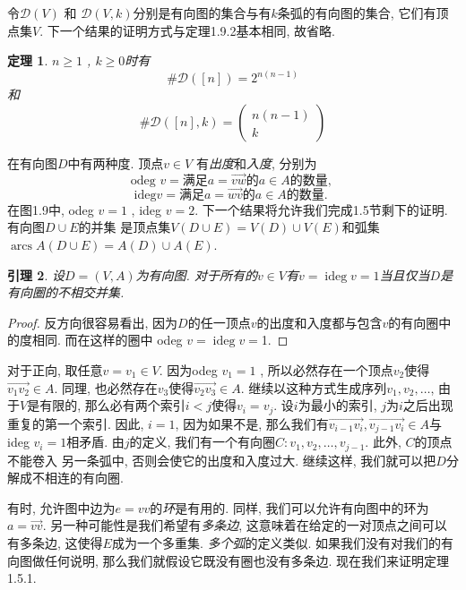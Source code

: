 \documentclass{ctexbook}
\newtheorem{thm}{定理}[section]
\newtheorem{lem}[thm]{引理}
\begin{document}
令$\mathcal{D}(V)$ 和 $\mathcal{D}(V, k)$分别是有向图的集合与有$k$条弧的有向图的集合, 它们有顶点集$V$.
下一个结果的证明方式与定理1.9.2基本相同, 故省略.
     \begin{thm}
    	$n \geqslant 1$ ,  $k \geqslant 0$时有
    	$$
    	\# \mathcal{D}([n])=2^{n(n-1)}
    	$$
    	和
    	$$
    	\# \mathcal{D}([n], k)=\left(\begin{array}{c}
    	n(n-1) \\
    	k
    	\end{array}\right)
    	$$
    \end{thm}

在有向图$D$中有两种度. 顶点$v \in V$ 有\textsl{出度}和\textsl{入度}, 分别为
$$
\text{odeg }v= \text{满足} a=\overrightarrow{v w} \text{的} a \in A \text{的数量, }
$$
$$
\text{ideg} v= \text{满足} a=\overrightarrow{w v} \text{的} a \in A \text{的数量. }
$$
在图1.9中, odeg $v=1$ ,  ideg $v=2$. 下一个结果将允许我们完成1.5节剩下的证明. 有向图$D \cup E$的并集
是顶点集$V(D \cup E)=V(D) \cup V(E)$和弧集$\operatorname{arcs} A(D \cup E)=A(D) \cup A(E)$.
    \begin{lem}
   设$D=(V, A)$为有向图. 对于所有的$v \in V$有$v=\operatorname{ideg} v=1$当且仅当$D$是有向圈的不相交并集.
   \end{lem}
   \begin{proof}
   	反方向很容易看出, 因为$D$的任一顶点$v$的出度和入度都与包含$v$的有向圈中的度相同. 而在这样的圈中 odeg $ v=\operatorname{ideg} v=$1.
   \end{proof}

对于正向, 取任意$v=v_{1} \in V$. 因为odeg $v_{1}=1$ , 所以必然存在一个顶点$v_{2}$使得$\overrightarrow{v_{1} v_{2}} \in A $.
同理, 也必然存在$v_{3}$使得$\overrightarrow{v_{2}v_{3}} \in A$. 继续以这种方式生成序列$v_{1}, v_{2}, \ldots$,
由于$V$是有限的, 那么必有两个索引$i<j$使得$v_{i}=v_{j}$. 设$i$为最小的索引, $j$为$i$之后出现重复的第一个索引. 因此,
$i=1$, 因为如果不是, 那么我们有$\overrightarrow{v_{i-1} v_{i}}, \overrightarrow{v_{j-1} v_{i}} \in A$与
ideg $v_{i}=1$相矛盾. 由$j$的定义, 我们有一个有向圈$C: v_{1}, v_{2}, \ldots, v_{j-1}$. 此外, $C$的顶点不能卷入
另一条弧中, 否则会使它的出度和入度过大. 继续这样, 我们就可以把$D$分解成不相连的有向圈. \hfill\qedsymbol

有时, 允许图中边为$e=v v$的\textsl{环}是有用的. 同样, 我们可以允许有向图中的环为$a=\overrightarrow{v v}$.
另一种可能性是我们希望有\textsl{多条边}, 这意味着在给定的一对顶点之间可以有多条边, 这使得$E$成为一个多重集. \textsl{多个弧}的定义类似.
如果我们没有对我们的有向图做任何说明, 那么我们就假设它既没有圈也没有多条边. 现在我们来证明定理1.5.1.
\end{document}
